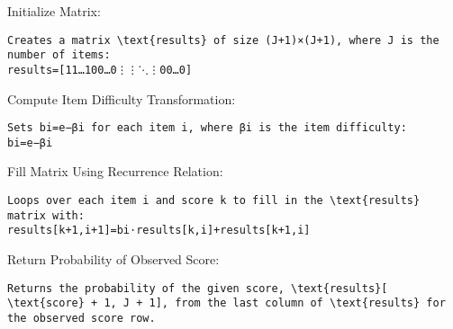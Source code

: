 \documentclass[
]{article}
\begin{document}
Initialize Matrix:

\begin{verbatim}
Creates a matrix \text{results} of size (J+1)×(J+1), where J is the number of items:
results=[11…100…0⋮⋮⋱⋮00…0]
\end{verbatim}

Compute Item Difficulty Transformation:

\begin{verbatim}
Sets bi=e−βi for each item i, where βi is the item difficulty:
bi=e−βi
\end{verbatim}

Fill Matrix Using Recurrence Relation:

\begin{verbatim}
Loops over each item i and score k to fill in the \text{results} matrix with:
results[k+1,i+1]=bi⋅results[k,i]+results[k+1,i]
\end{verbatim}

Return Probability of Observed Score:

\begin{verbatim}
Returns the probability of the given score, \text{results}[ \text{score} + 1, J + 1], from the last column of \text{results} for the observed score row.
\end{verbatim}
\end{document}
